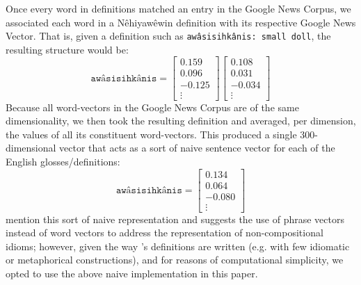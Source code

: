 Once every word in \citet{Wolvengrey2001} definitions matched an entry in the Google News Corpus, we associated each word in a Nêhiyawêwin definition with its respective Google News Vector. That is, given a definition such as \texttt{awâsisihkânis: small doll}, the resulting structure would be:
\begin{displaymath}
    \texttt{awâsisihkânis} = \begin{bmatrix}
0.159 \\ 0.096 \\ -0.125 \\ \vdots 
         \end{bmatrix}
\begin{bmatrix}
0.108 \\ 0.031 \\ -0.034 \\ \vdots 
         \end{bmatrix}
\end{displaymath}
Because all word-vectors in the Google News Corpus are of the same dimensionality, we then took the resulting definition and averaged, per dimension, the values of all its constituent word-vectors. This produced a single 300-dimensional vector that acts as a sort of naive sentence vector for each of the English glosses/definitions:
\begin{displaymath}
    \texttt{awâsisihkânis} = \begin{bmatrix}
0.134 \\ 0.064 \\ -0.080 \\ \vdots 
         \end{bmatrix}
\end{displaymath}
\citet{mikolov2013distributed} mention this sort of naive representation and suggests the use of phrase vectors instead of word vectors to address the representation of non-compositional idioms; however, given the way \citet{Wolvengrey2001}'s definitions are written (e.g. with few idiomatic or metaphorical constructions), and for reasons of computational simplicity, we opted to use the above naive implementation in this paper.

